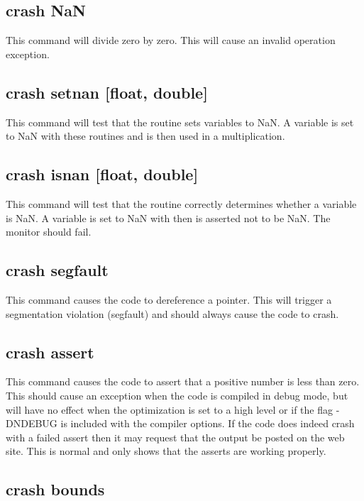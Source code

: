 \subsection{crash NaN}

This command will divide zero by zero.  This will cause an invalid operation
exception.

\subsection{crash setnan [float, double]}

This command will test that the routine  sets
variables to NaN.  A variable is set
to NaN with these routines and is then used in a multiplication.

\subsection{crash isnan [float, double]}

This command will test that the routine  correctly
determines whether a variable is NaN.  A variable is set to NaN with
then is asserted not to be NaN.  The monitor should fail.

\subsection{crash segfault}

This command causes the code to dereference a  pointer. This will
trigger a segmentation violation (segfault) and should always cause the code to crash.

\subsection{crash assert}

This command causes the code to assert that a positive number is less
than zero.  This should cause an exception when the code is compiled in
debug mode, but will have no effect when the optimization is set to a high
level or if the flag -DNDEBUG is included with the compiler options.  If
the code does indeed crash with a failed assert then it may request that
the output be posted on the web site.  This is normal and only shows that
the asserts are working properly.

\subsection{crash bounds}

